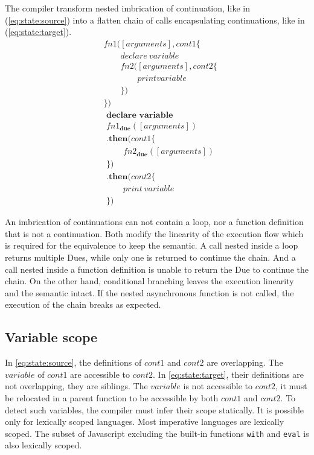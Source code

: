 The compiler transform nested imbrication of continuation, like in (\ref{eq:state:source}) into a flatten chain of calls encapsulating continuations, like in (\ref{eq:state:target}).
\begin{align} \label{eq:state:source}
&fn1([arguments], cont1 \{\nonumber\\
&\qquad  declare ~ variable\nonumber\\
&\qquad  fn2([arguments], cont2 \{\nonumber\\
&\qquad\qquad    print variable\nonumber\\
&\qquad  \})\nonumber\\
&\})
\end{align}
\begin{align} \label{eq:state:target}
&\textbf{declare variable}\nonumber\\
&fn1_\textbf{due}([arguments])\nonumber\\
&\textbf{.then}(cont1\{\nonumber\\
&\qquad  fn2_\textbf{due}([arguments])\nonumber\\
&\})\nonumber\\
&\textbf{.then}(cont2\{\nonumber\\
&\qquad  print ~ variable\nonumber\\
&\})
\end{align}

An imbrication of continuations can not contain a loop, nor a function definition that is not a continuation.
Both modify the linearity of the execution flow which is required for the equivalence to keep the semantic.
A call nested inside a loop returns multiple Dues, while only one is returned to continue the chain.
And a call nested inside a function definition is unable to return the Due to continue the chain.
On the other hand, conditional branching leaves the execution linearity and the semantic intact.
If the nested asynchronous function is not called, the execution of the chain breaks as expected.

\subsection{Variable scope}

In \ref{eq:state:source}, the definitions of $cont1$ and $cont2$ are overlapping.
The $variable$ of $cont1$ are accessible to $cont2$.
In \ref{eq:state:target}, their definitions are not overlapping, they are siblings.
The $variable$ is not accessible to $cont2$, it must be relocated in a parent function to be accessible by both $cont1$ and $cont2$.
To detect such variables, the compiler must infer their scope statically.
It is possible only for lexically scoped languages.
Most imperative languages are lexically scoped.
The subset of Javascript excluding the built-in functions \texttt{with} and \texttt{eval} is also lexically scoped.